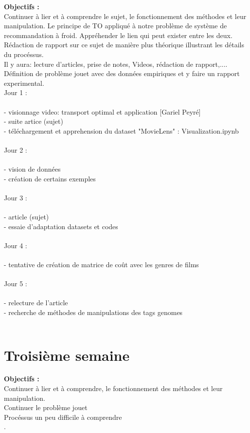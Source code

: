 \documentclass{article}
\begin{document}
    \textbf{Objectifs : }\newline\\
    Continuer à lier et à comprendre le sujet, le fonctionnement des méthodes et leur manipulation. Le principe de TO appliqué à notre problème de système de recommandation à froid.
    Appréhender le lien qui peut exister entre les deux.
    Rédaction de rapport sur ce sujet de manière plus théorique illustrant les détails du procéssus.\\
    Il y aura: lecture d'articles, prise de notes, Videos, rédaction de rapport,....\\
    Définition de problème jouet avec des données empiriques et y faire un rapport experimental.\newline\\
    Jour 1 : \\\\
        - visionnage video: transport optimal et application [Gariel Peyré]\\
        - suite artice (sujet)\\
        - téléchargement et apprehension du dataset "MovieLens" : Visualization.ipynb\\\\
    Jour 2 : \\\\
        - vision de données\\
        - création de certains exemples\\\\
    Jour 3 : \\\\
        - article (sujet)\\
        - essaie d'adaptation datasets et codes\\\\
    Jour 4 : \\\\
        - tentative de création de matrice de coût avec les genres de films\\\\
    Jour 5 : \\\\
        - relecture de l'article\\
        - recherche de méthodes de manipulations des tags genomes\\\\

\section{Troisième semaine}

    \textbf{Objectifs : }\newline\\
    Continuer à lier et à comprendre, le fonctionnement des méthodes et leur manipulation. \\
    Continuer le problème jouet\\
    Procéssus un peu difficile à comprendre\\
    .\newline\\
    
        
\end{document}
